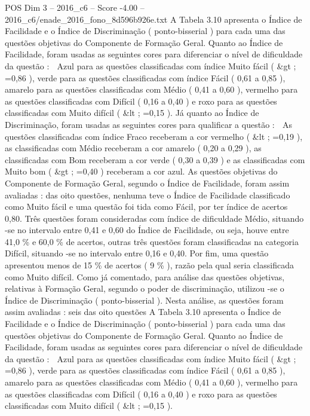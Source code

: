 \begin{textsample}{POS Dim 3 – 2016\_c6 – Score -4.00 – 2016\_c6/enade\_2016\_fono\_8d596b926e.txt}
A Tabela 3.10 apresenta o Índice de Facilidade e o Índice de Discriminação ( ponto-bisserial ) para cada uma das questões objetivas do Componente de Formação Geral.
Quanto ao Índice de Facilidade, foram usadas as seguintes cores para diferenciar o nível de dificuldade da questão :  Azul para as questões classificadas com índice Muito fácil ( \&gt ; =0,86 ), verde para as questões classificadas com índice Fácil ( 0,61 a 0,85 ), amarelo para as questões classificadas com Médio ( 0,41 a 0,60 ), vermelho para as questões classificadas com Difícil ( 0,16 a 0,40 ) e roxo para as questões classificadas com Muito difícil ( \&lt ; =0,15 ).
Já quanto ao Índice de Discriminação, foram usadas as seguintes cores para qualificar a questão :  As questões classificadas com índice Fraco receberam a cor vermelho ( \&lt ; =0,19 ), as classificadas com Médio receberam a cor amarelo ( 0,20 a 0,29 ), as classificadas com Bom receberam a cor verde ( 0,30 a 0,39 ) e as classificadas com Muito bom ( \&gt ; =0,40 ) receberam a cor azul.
As questões objetivas do Componente de Formação Geral, segundo o Índice de Facilidade, foram assim avaliadas : das oito questões, nenhuma teve o Índice de Facilidade classificado como Muito fácil e uma questão foi tida como Fácil, por ter índice de acertos 0,80.
Três questões foram consideradas com índice de dificuldade Médio, situando -se no intervalo entre 0,41 e 0,60 do Índice de Facilidade, ou seja, houve entre 41,0 \% e 60,0 \% de acertos, outras três questões foram classificadas na categoria Difícil, situando -se no intervalo entre 0,16 e 0,40.
Por fim, uma questão apresentou menos de 15 \% de acertos ( 9 \% ), razão pela qual seria classificada como Muito difícil.
Como já comentado, para análise das questões objetivas, relativas à Formação Geral, segundo o poder de discriminação, utilizou -se o Índice de Discriminação ( ponto-bisserial ).
Nesta análise, as questões foram assim avaliadas : seis das oito questões A Tabela 3.10 apresenta o Índice de Facilidade e o Índice de Discriminação ( ponto-bisserial ) para cada uma das questões objetivas do Componente de Formação Geral.
Quanto ao Índice de Facilidade, foram usadas as seguintes cores para diferenciar o nível de dificuldade da questão :  Azul para as questões classificadas com índice Muito fácil ( \&gt ; =0,86 ), verde para as questões classificadas com índice Fácil ( 0,61 a 0,85 ), amarelo para as questões classificadas com Médio ( 0,41 a 0,60 ), vermelho para as questões classificadas com Difícil ( 0,16 a 0,40 ) e roxo para as questões classificadas com Muito difícil ( \&lt ; =0,15 ).

\end{textsample}
